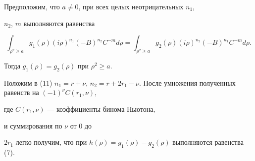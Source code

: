 \begin{lem}


Предположим, что $a \ne 0$, при всех целых неотрицательных $n_{1}$, 


$n_{2}$, $m $ выполняются равенства


\begin{equation}


\int_{\rho^{2} \ge a} g_{1}(\rho) (i\rho)^{n_{1}}


(-B)^{n_{2}} C^{-m} d\rho =


\int_{\rho^{2} \ge a} g_{2}(\rho) (i\rho)^{n_{2}}


(-B)^{n_{1}} C^{-m} d\rho. 


\end{equation}


Тогда $g_{1}(\rho)=g_{2}(\rho)$ при $\rho ^{2} \ge a$.


\end{lem}





\begin{pf}


Положим в (11) $n_{1}=r+ \nu$, $n_{2}=


 r+ 2r_{1}-\nu$. После умножения полученных равенств на $(-1)^\nu C(r_1,\nu)$,


где $C(r_1,\nu)$ --- коэффициенты бинома Ньютона, 


и суммирования по $\nu$ от 0 до


$2r_{1}$ легко получим, что при $ h(\rho)= g_{1}(\rho)-


g_{2}(\rho)$ выполняются равенства (7).


\end{pf}





